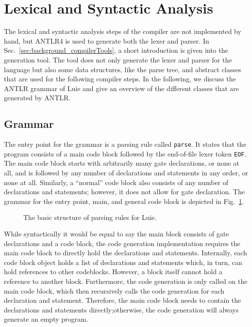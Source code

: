 \section{Lexical and Syntactic Analysis}
\label{sec:implementation_syntaxAnalysis}
The lexical and syntactic analysis steps of the compiler are not implemented by hand, but ANTLR4 is used to generate both the lexer and parser. In Sec.~\ref{sec:background_compilerTools}, a short introduction is given into the generation tool. The tool does not only generate the lexer and parser for the language but also some data structures, like the parse tree, and abstract classes that are used for the following compiler steps. In the following, we discuss the ANTLR grammar of Luie and give an overview of the different classes that are generated by ANTLR.

\subsection{Grammar}
\label{sec:implementation_grammar}
The entry point for the grammar is a parsing rule called \texttt{parse}. It states that the program consists of a main code block followed by the end-of-file lexer token \texttt{EOF}. The main code block starts with arbitrarily many gate declarations, or none at all, and is followed by any number of declarations and statements in any order, or none at all. Similarly, a ``normal'' code block also consists of any number of declarations and statements; however, it does not allow for gate declaration. The grammar for the entry point, main, and general code block is depicted in Fig.~\ref{fig:implementation_grammarStructure}.

\begin{figure}[htp]
    \centering
    
    \caption{The basic structure of parsing rules for Luie.}
    \label{fig:implementation_grammarStructure}
\end{figure}

While syntactically it would be equal to say the main block consists of gate declarations and a code block, the code generation implementation requires the main code block to directly hold the declarations and statements. Internally, each code block object holds a list of declarations and statements which, in turn, can hold references to other codeblocks. However, a block itself cannot hold a reference to another block. Furthermore, the code generation is only called on the main code block, which then recursively calls the code generation for each declaration and statement. Therefore, the main code block needs to contain the declarations and statements directly;otherwise, the code generation will always generate an empty program. 

